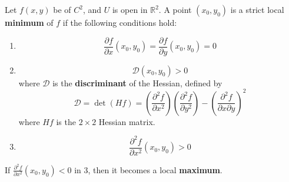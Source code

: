 \documentclass[openany]{book}
\newcommand{\R}{\mathbb{R}}
\begin{document}
\begin{prop}
    Let $f(x,y)$ be of $C^2$, and $U$ is open in $\R^2$. A point $(x_0,y_0)$ is a strict local \textbf{minimum} of $f$ if the following conditions hold:
    \begin{enumerate}
        \item \begin{equation*}
            \frac{\partial f}{\partial x}(x_0,y_0)=\frac{\partial f}{\partial y}(x_0,y_0)=0
        \end{equation*}
        \item \begin{equation*}
            \mathcal{D}(x_0,y_0)>0
        \end{equation*}
        where $\mathcal{D}$ is the \textbf{discriminant} of the Hessian, defined by 
        \begin{equation*}
            \mathcal{D}=\det (Hf)=\left(\frac{\partial^2 f}{\partial x^2}\right)\left(\frac{\partial^2 f}{\partial y^2}\right)-\left(\frac{\partial^2 f}{\partial x\partial y}\right)^2
        \end{equation*}
        where $Hf$ is the $2\times 2$ Hessian matrix.
        \item  \begin{equation*}
            \frac{\partial^2f}{\partial x^2}(x_0,y_0)>0
        \end{equation*}
    \end{enumerate}
    If $ \frac{\partial^2f}{\partial x^2}(x_0,y_0)<0$ in 3, then it becomes a local \textbf{maximum}.
\end{prop}


\end{document}

